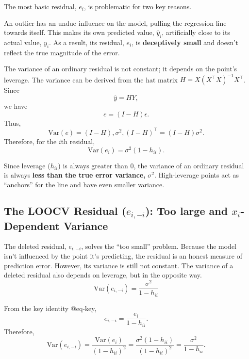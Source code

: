 \documentclass[
]{article}
\begin{document}
The most basic residual, \(e_i\), is problematic for two key reasons.

An outlier has an undue influence on the model, pulling the regression
line towards itself. This makes its own predicted value, \(\hat{y}_i\),
artificially close to its actual value, \(y_i\). As a result, its
residual, \(e_i\), is \textbf{deceptively small} and doesn't reflect the
true magnitude of the error.

The variance of an ordinary residual is not constant; it depends on the
point's leverage. The variance can be derived from the hat matrix
\(H = X(X^\top X)^{-1}X^\top\). Since \[\hat{y} = HY,\] we have
\begin{equation}
e = (I - H)\epsilon.
\end{equation} Thus, \begin{equation}
\mathrm{Var}(e) = (I-H),\sigma^2,(I-H)^\top = (I-H)\sigma^2.
\end{equation} Therefore, for the \(i\)th residual, \begin{equation}
\mathrm{Var}(e_i) = \sigma^2(1 - h_{ii}).
\end{equation}

Since leverage (\(h_{ii}\)) is always greater than 0, the variance of an
ordinary residual is always \textbf{less than the true error variance,}
\(\sigma^2\). High-leverage points act as ``anchors'' for the line and
have even smaller variance.

\subsection{\texorpdfstring{\textbf{The LOOCV Residual (}\(e_{i,-i}\)):
Too large and \(x_i\)-Dependent
Variance}{The LOOCV Residual (e\_\{i,-i\}): Too large and x\_i-Dependent Variance}}\label{the-loocv-residual-e_i-i-too-large-and-x_i-dependent-variance}

The deleted residual, \(e_{i,-i}\), solves the ``too small'' problem.
Because the model isn't influenced by the point it's predicting, the
residual is an honest measure of prediction error. However, its variance
is still not constant. The variance of a deleted residual also depends
on leverage, but in the opposite way. \begin{equation}
\text{Var}(e_{i,-i}) = \frac{\sigma^2}{1 - h_{ii}}
\end{equation}

From the key identity @eq-key, \begin{equation}
e_{i,-i} = \frac{e_i}{1 - h_{ii}}.
\end{equation} Therefore, \begin{equation}
\mathrm{Var}(e_{i,-i}) = \frac{\mathrm{Var}(e_i)}{(1-h_{ii})^2}
= \frac{\sigma^2(1-h_{ii})}{(1-h_{ii})^2}
= \frac{\sigma^2}{1-h_{ii}}.
\end{equation}
\end{document}
